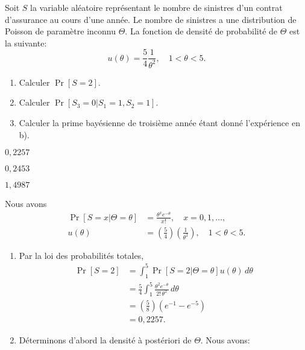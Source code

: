\begin{exercice}
  Soit $S$ la variable aléatoire représentant le nombre de sinistres
  d'un contrat d'assurance au cours d'une année. Le nombre de
  sinistres a une distribution de Poisson de paramètre inconnu
  $\Theta$. La fonction de densité de probabilité de $\Theta$ est la
  suivante:
  \begin{equation*}
    u(\theta) = \frac{5}{4} \frac{1}{\theta^2}, \quad 1 < \theta < 5.
  \end{equation*}
  \begin{enumerate}
  \item Calculer $\Pr[S = 2]$.
  \item Calculer $\Pr[S_3 = 0|S_1 = 1, S_2 = 1]$.
  \item Calculer la prime bayésienne de troisième année étant donné
    l'expérience en b).
  \end{enumerate}
  \begin{rep}
    \begin{inparaenum}
    \item $0,2257$
    \item $0,2453$
    \item $1,4987$
    \end{inparaenum}
  \end{rep}
  \begin{sol}
    Nous avons
    \begin{align*}
      \Pr[S = x|\Theta = \theta]
      &= \frac{\theta^x e^{-\theta}}{x!}, \quad x = 0, 1, \dots, \\
      u(\theta)
      &= \left(\frac{5}{4}\right) \left(\frac{1}{\theta^2}\right),
      \quad 1 < \theta < 5.
    \end{align*}
    \begin{enumerate}
    \item Par la loi des probabilités totales,
      \begin{align*}
        \Pr[S = 2]
        &= \int_1^5 \Pr[S = 2|\Theta = \theta] u(\theta)\, d\theta \\
        &= \frac{5}{4} \int_1^5 \frac{\theta^2 e^{-\theta}}{2!\,
          \theta^2}\, d\theta \\
        &= \left(\frac{5}{8}\right) (e^{-1} - e^{-5}) \\
        &= 0,2257.
      \end{align*}
    \item Déterminons d'abord la densité à postériori de $\Theta$.
      Nous avons:
      \begin{align*}

\end{align*}
\end{enumerate}
\end{sol}
\end{exercice}
